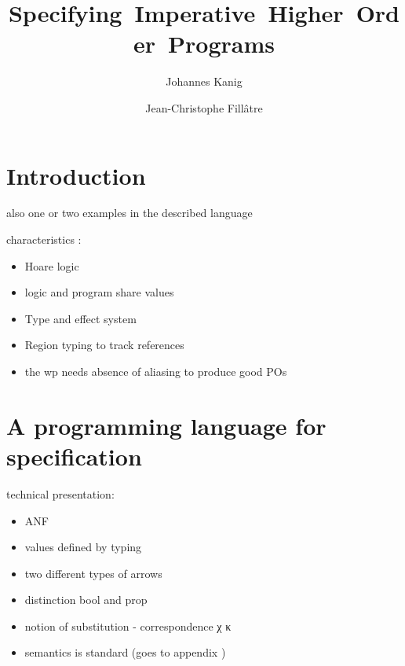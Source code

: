 \documentclass[a4paper]{llncs}
\begin{document}
\title{\mbox{Specifying Imperative Higher Order Programs}}

\author{Johannes Kanig \and Jean-Christophe Fill\^atre}
% 


\maketitle

\begin{abstract}
\end{abstract}


\section{Introduction}

also one or two examples in the described language

characteristics : 
\begin{itemize}
  \item Hoare logic
  \item logic and program share values  
  \item Type and effect system
  \item Region typing to track references
  \item the wp needs absence of aliasing to produce good POs
\end{itemize}

\section{A programming language for specification}

technical presentation:
\begin{itemize}
  \item ANF
  \item values defined by typing 
  \item  two different types of arrows
  \item  distinction bool and prop
  \item  notion of substitution - correspondence χ κ
  \item semantics is standard (goes to appendix )
\end{itemize}
\end{document}
